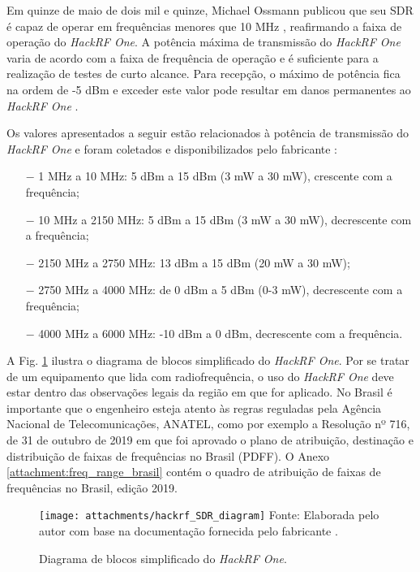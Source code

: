 \documentclass[
  12pt,				%
  openright,			%
  twoside,			%
  a4paper,			%
  english,			%
  french,				%
  spanish,			%
  brazil,				%
  ]{abntex2}
\begin{document}
Em quinze de maio de dois mil e quinze, Michael Ossmann publicou que seu SDR é capaz de operar em frequências menores que 10 MHz \cite{HACKRF-1mhz}, reafirmando a faixa de operação do \textit{HackRF One}.
A potência máxima de transmissão do \textit{HackRF One} varia de acordo com a faixa de frequência de operação e é suficiente para a realização de testes de curto alcance. Para recepção, o máximo de
potência fica na ordem de -5 dBm e exceder este valor pode resultar em danos permanentes ao \textit{HackRF One} \cite{HACKRF-hardware-receive-power}.

Os valores apresentados a seguir estão relacionados à potência de transmissão do \textit{HackRF One} e foram coletados e disponibilizados pelo fabricante \cite{HACKRF-hardware-transmit-power}:

\begin{itemize}
  \item[$-$] 1 MHz a 10 MHz: 5 dBm a 15 dBm (3 mW a 30 mW), crescente com a frequência;
  \item[$-$] 10 MHz a 2150 MHz: 5 dBm a 15 dBm (3 mW a 30 mW), decrescente com a frequência;
  \item[$-$] 2150 MHz a 2750 MHz: 13 dBm a 15 dBm (20 mW a 30 mW);
  \item[$-$] 2750 MHz a 4000 MHz: de 0 dBm a 5 dBm (0-3 mW), decrescente com a frequência;
  \item[$-$] 4000 MHz a 6000 MHz: -10 dBm a 0 dBm, decrescente com a frequência.
\end{itemize}

A Fig. \ref{fig:hackrf_block_diagram} ilustra o diagrama de blocos simplificado do \textit{HackRF One}. Por se tratar de um equipamento que lida com radiofrequência, o uso do \textit{HackRF One} deve estar dentro das observações legais da região em que for aplicado. No Brasil é importante que o
engenheiro esteja atento às regras reguladas pela Agência Nacional de Telecomunicações, ANATEL, como por exemplo a Resolução nº 716, de 31 de outubro de 2019 em que foi aprovado o plano de
atribuição, destinação e distribuição de faixas de frequências no Brasil (PDFF). O Anexo \ref{attachment:freq_range_brasil} contém o quadro de atribuição de faixas de frequências no Brasil, edição 2019.

\begin{figure}[!htb]
  \centering
  \caption{Diagrama de blocos simplificado do \textit{HackRF One}.}
  \texttt{[image: attachments/hackrf\_SDR\_diagram]}
  Fonte: Elaborada pelo autor com base na documentação fornecida pelo fabricante \cite{HACKRF-hardware-components}.
  \label{fig:hackrf_block_diagram}
\end{figure}
\end{document}
